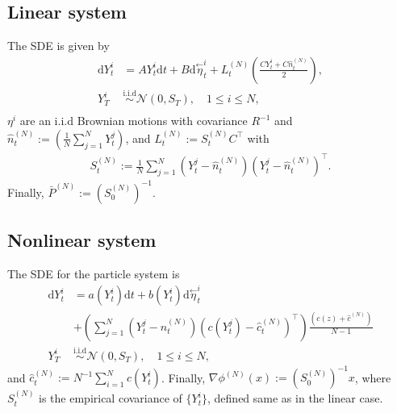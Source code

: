 \documentclass[10pt,a4paper]{amsart}
\newcommand{\tp}{^\top}
\newcommand{\inv}{^{-1}}
\newcommand{\ud}{\mathrm{d}}
\newcommand{\grad}{\nabla}
\newcommand{\backward}[1]{\overset{\leftarrow}{#1}}
\begin{document}
\subsection{Linear system}
\label{app:linenkf}
The SDE \cite[Section 2]{joshi-2022} is given by
\begin{align*}
\ud {Y}^i_t &= {A {Y}^i_t \ud t + B\ud \backward{\eta}^i_t } + 
L^{(N)}_t \left(\frac{C{Y}^i_t+ C\hat{n}^{(N)}_t}{2} \right), \\ 
{Y}^i_T  &\stackrel{\text{i.i.d}}{\sim} \mathcal
N(0,S_T),\quad 1\leq i\leq N, \\
\end{align*}
${\eta}^i$ are an i.i.d Brownian motions with covariance $R\inv$ and $\hat{n}^{(N)}_t := \left( \frac{1}{N} \sum_{j=1}^{N} Y_t^j \right) $, and $L_t^{(N)} := S_t^{(N)}C\tp$ with
\begin{align*}
S^{(N)}_t := \frac{1}{N} \sum_{j=1}^{N} ({Y}_t^j - \hat{n}_t^{(N)}) ({Y}_t^j - \hat{n}_t^{(N)})\tp. 
\end{align*}
Finally, $\bar{P}^{(N)} := (S^{(N)}_0)\inv$.

\subsection{Nonlinear system}
\label{app:nlenkf}
The SDE \cite[Section 3]{joshi-2022} for the particle system is
\begin{align*}
\ud {Y}^i_t &= {a ({ Y}^i_t)\ud t +  b ({ Y}^i_t) \ud \backward{\eta}^i_t}  
 \\
 &+ \left(\sum_{j=1}^{N}(Y_t^j - n^{(N)}_t )(c({ Y}^j_t) - \hat{c}_t^{(N)}  )^\top\right) \frac{(c(z) + \hat{c}^{(N)})}{N-1} \\
{Y}^i_T  &\stackrel{\text{i.i.d}}{\sim} \mathcal
N(0,S_T),\quad 1\leq i\leq N, 
\end{align*}
and $\hat{c}^{(N)}_{t} := N^{-1} \sum_{i=1}^N c(Y^i_{t})$. Finally, $\grad\phi^{(N)}(x) := (S^{(N)}_0)\inv x$, where $S^{(N)}_t$ is the empirical covariance of $\{Y_t^i\}$, defined same as in the linear case. 
\end{document}

